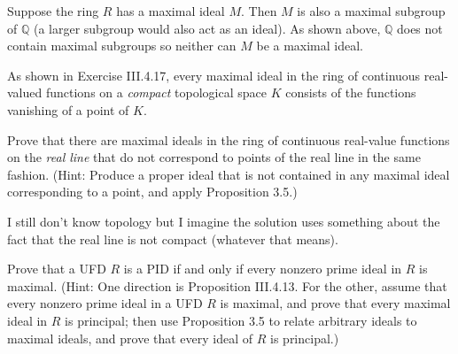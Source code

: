 \documentclass[../../master.tex]{subfiles}
\begin{document}
    \begin{solution}
        Suppose the ring $R$ has a maximal ideal $M$. Then $M$ is also a maximal
        subgroup of $\mathbb{Q}$ (a larger subgroup would also act as an ideal).
        As shown above, $\mathbb{Q}$ does not contain maximal subgroups so
        neither can $M$ be a maximal ideal.
    \end{solution}

    \begin{problem}
        As shown in Exercise III.4.17, every maximal ideal in the ring of
        continuous real-valued functions on a \textit{compact} topological space
        $K$ consists of the functions vanishing of a point of $K$.

        Prove that there are maximal ideals in the ring of continuous real-value
        functions on the \textit{real line} that do not correspond to points of
        the real line in the same fashion. (Hint: Produce a proper ideal that is
        not contained in any maximal ideal corresponding to a point, and apply
        Proposition 3.5.)
    \end{problem}

    \begin{solution}
        I still don't know topology but I imagine the solution uses something
        about the fact that the real line is not compact (whatever that means).
    \end{solution}

    \begin{problem}
        Prove that a UFD $R$ is a PID if and only if every nonzero prime ideal
        in $R$ is maximal. (Hint: One direction is Proposition III.4.13. For the
        other, assume that every nonzero prime ideal in a UFD $R$ is maximal,
        and prove that every maximal ideal in $R$ is principal; then use
        Proposition 3.5 to relate arbitrary ideals to maximal ideals, and prove
        that every ideal of $R$ is principal.)
    \end{problem}
\end{document}
